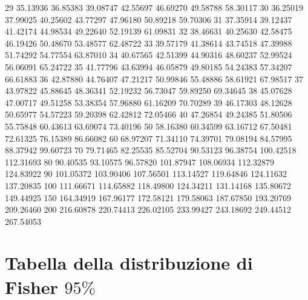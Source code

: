 \documentclass[onecolumn,12pt]{book}
\begin{document}
\begin{Schunk}
\begin{Soutput}
29   35.13936  36.85383  39.08747  42.55697  46.69270  49.58788  58.30117
30   36.25019  37.99025  40.25602  43.77297  47.96180  50.89218  59.70306
31   37.35914  39.12437  41.42174  44.98534  49.22640  52.19139  61.09831
32   38.46631  40.25630  42.58475  46.19426  50.48670  53.48577  62.48722
33   39.57179  41.38614  43.74518  47.39988  51.74292  54.77554  63.87010
34   40.67565  42.51399  44.90316  48.60237  52.99524  56.06091  65.24722
35   41.77796  43.63994  46.05879  49.80185  54.24383  57.34207  66.61883
36   42.87880  44.76407  47.21217  50.99846  55.48886  58.61921  67.98517
37   43.97822  45.88645  48.36341  52.19232  56.73047  59.89250  69.34645
38   45.07628  47.00717  49.51258  53.38354  57.96880  61.16209  70.70289
39   46.17303  48.12628  50.65977  54.57223  59.20398  62.42812  72.05466
40   47.26854  49.24385  51.80506  55.75848  60.43613  63.69074  73.40196
50   58.16380  60.34599  63.16712  67.50481  72.61325  76.15389  86.66082
60   68.97207  71.34110  74.39701  79.08194  84.57995  88.37942  99.60723
70   79.71465  82.25535  85.52704  90.53123  96.38754 100.42518 112.31693
80   90.40535  93.10575  96.57820 101.87947 108.06934 112.32879 124.83922
90  101.05372 103.90406 107.56501 113.14527 119.64846 124.11632 137.20835
100 111.66671 114.65882 118.49800 124.34211 131.14168 135.80672 149.44925
150 164.34919 167.96177 172.58121 179.58063 187.67850 193.20769 209.26460
200 216.60878 220.74413 226.02105 233.99427 243.18692 249.44512 267.54053
\end{Soutput}
\end{Schunk}
\normalsize\section*{Tabella della distribuzione di Fisher $95\%$}
\oddsidemargin 0.0in
\evensidemargin 0.0in
\topmargin -0.4in
\small
\end{document}
